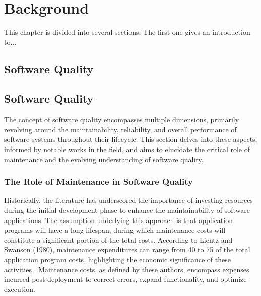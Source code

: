 
%

\chapter{Background}
\label{cha:Background}


This chapter is divided into several sections. The first one gives an introduction to...


\section{Software Quality}
\cite{MetricsMaintainability1994}
\cite{ManagingMaintenance1983}
\cite{lientz1980software}
\cite{MaintenanceGlass1998}

\section{Software Quality}

The concept of software quality encompasses multiple dimensions, primarily revolving around the maintainability, reliability, and overall performance of software systems throughout their lifecycle. This section delves into these aspects, informed by notable works in the field, and aims to elucidate the critical role of maintenance and the evolving understanding of software quality.

\subsection{The Role of Maintenance in Software Quality}

Historically, the literature has underscored the importance of investing resources during the initial development phase to enhance the maintainability of software applications. The assumption underlying this approach is that application programs will have a long lifespan, during which maintenance costs will constitute a significant portion of the total costs. According to Lientz and Swanson (1980), maintenance expenditures can range from 40 to 75 of the total application program costs, highlighting the economic significance of these activities . Maintenance costs, as defined by these authors, encompass expenses incurred post-deployment to correct errors, expand functionality, and optimize execution.

